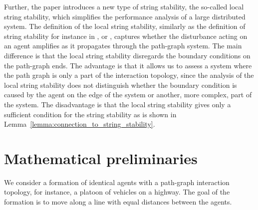 \documentclass[10pt,twocolumn,twoside]{IEEEtran}
\theoremstyle{definition}
\newcommand{\revA}{Black}
\begin{document}
{\color{\revA} Further, the paper introduces a new type of string stability, the so-called local string stability, which simplifies the performance analysis of a large distributed system. The definition of the local string stability, similarly as the definition of string stability for instance in \cite{Ploeg2014}, \cite{Seiler2004a} or \cite{Eyre1998a}, captures whether the disturbance acting on an agent amplifies as it propagates through the path-graph system. The main difference is that the local string stability disregards the boundary conditions on the path-graph ends. The advantage is that it allows us to assess a system where the path graph is only a part of the interaction topology, since the analysis of the local string stability does not distinguish whether the boundary condition is caused by the agent on the edge of the system or another, more complex, part of the system. The disadvantage is that the local string stability gives only a sufficient condition for the string stability as is shown in Lemma~\ref{lemma:connection_to_string_stability}.

}










\section{Mathematical preliminaries}

We consider a formation of identical agents with a path-graph interaction topology, for instance, a platoon of vehicles on a highway. The goal of the formation is to move along a line with equal distances between the agents.
\end{document}
